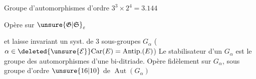 Groupe d'automorphismes 
d'ordre $3^3\times2^4=3.144$ \unsure{,}

Opère sur $\unsure{\mathfrak G|\mathfrak S}_{\varepsilon}$

et laisse invariant  un syst.
de $3$ sous-groupes $G_\alpha$
($\alpha\in\deleted{\unsure{\mathcal E}}\mathrm{Car}(E)=\mathrm{Antip.}(E)$)
Le stabilisateur d'un $G_\alpha$ est le groupe des
automorphismes d'une bi-ditriade. Opère
fidèlement sur $G_\alpha$, sous groupe d'ordre $\unsure{16|10}$ de
$\operatorname{Aut}(G_\alpha)$

